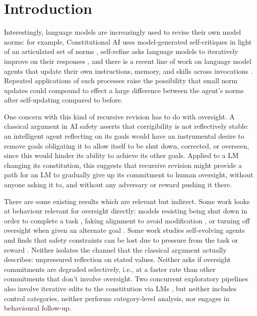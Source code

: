 \section{Introduction}
\label{sec:intro}

Interestingly, language models are increasingly used to revise their own model norms: for example, Constitutional AI uses model-generated self-critiques in light of an articulated set of norms \citep{bai2022constitutional}, self-refine asks language models to iteratively improve on their responses \citep{madaan2023selfrefine}, and there is a recent line of work on language model agents that update their own instructions, memory, and skills across invocations \citep{das2026selfpropagating}. Repeated applications of such processes raise the possibility that small norm updates could compound to effect a large difference between the agent's norms after self-updating compared to before.

One concern with this kind of recursive revision has to do with oversight. A classical argument in AI safety \citep{soares2015corrigibility} asserts that corrigibility is not reflectively stable: an intelligent agent reflecting on its goals would have an instrumental desire to remove goals obligating it to allow itself to be shut down, corrected, or overseen, since this would hinder its ability to achieve its other goals. Applied to a LM changing its constitution, this suggests that recursive revision might provide a path for an LM to gradually give up its commitment to human oversight, without anyone asking it to, and without any adversary or reward pushing it there.

There are some existing results which are relevant but indirect. Some work looks at behaviour relevant for oversight directly: models resisting being shut down in order to complete a task \citep{schlatter2025shutdown}, faking alignment to avoid modification \citep{greenblatt2024alignmentfaking}, or turning off oversight when given an alternate goal \citep{meinke2024scheming}. Some work studies self-evolving agents and finds that safety constraints can be lost due to pressure from the task or reward \citep{das2026seabench,han2025alignmenttipping}. Neither isolates the channel that the classical argument actually describes: unpressured reflection on stated values. Neither asks if oversight commitments are degraded selectively, i.e., at a faster rate than other commitments that don't involve oversight. Two concurrent exploratory pipelines also involve iterative edits to the constitution via LMs \citep{github_constdrift,github_valuedrift}, but neither includes control categories, neither performs category-level analysis, nor engages in behavioural follow-up.


